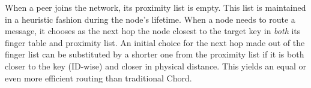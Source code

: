 When a peer joins the network, its proximity list is empty.
This list is maintained in a heuristic fashion during the node's lifetime.
When a node needs to route a message, it chooses as the next hop 
the node closest to the target key 
in \emph{both} its finger table and proximity list. 
An initial choice for the next hop made out of the finger list 
can be substituted by a shorter one from the proximity list if  
it is both closer to the key (ID-wise) and closer in physical distance.
This yields an equal or even more efficient routing than traditional Chord.

